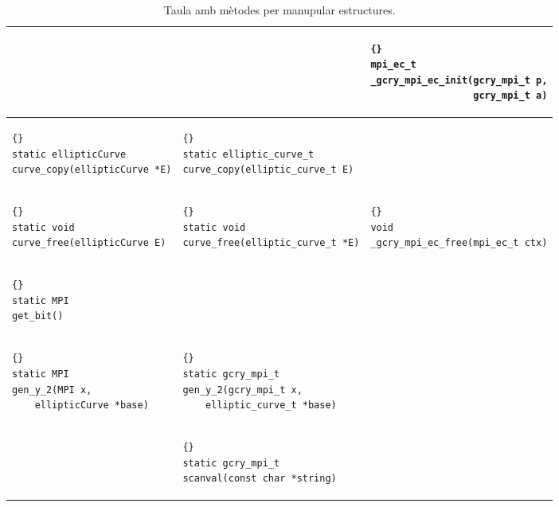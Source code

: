 \documentclass[12pt,twoside,catalan,a4paper]{book}%
\numberwithin{figure}{section}		%
\theoremstyle{definition}   			%
\def\ces{corbes e\lgem{}\'{\i}ptiques}%
\theoremstyle{saltolinea}   			%
\begin{document}
\begin{table}
\begin{center}
\begin{sideways}
\begin{tabular}{|l||l|l|}
\hline
 & &
 {\tt \begin{lstlisting}{}
mpi_ec_t
_gcry_mpi_ec_init(gcry_mpi_t p,
                  gcry_mpi_t a)
      \end{lstlisting} }
 \\
\hline
 {\tt \begin{lstlisting}{}
static ellipticCurve
curve_copy(ellipticCurve *E)
      \end{lstlisting} }
 &
 {\tt \begin{lstlisting}{}
static elliptic_curve_t
curve_copy(elliptic_curve_t E)
      \end{lstlisting} }
 & \\
\hline
 {\tt \begin{lstlisting}{}
static void
curve_free(ellipticCurve E)
      \end{lstlisting} }
 &
 {\tt \begin{lstlisting}{}
static void
curve_free(elliptic_curve_t *E)
      \end{lstlisting} }
 &
 {\tt \begin{lstlisting}{}
void
_gcry_mpi_ec_free(mpi_ec_t ctx)
      \end{lstlisting} }
 \\
\hline
 {\tt \begin{lstlisting}{}
static MPI
get_bit()
      \end{lstlisting} }
 & & \\
\hline
 {\tt \begin{lstlisting}{}
static MPI
gen_y_2(MPI x,
    ellipticCurve *base)
      \end{lstlisting} }
 &
 {\tt \begin{lstlisting}{}
static gcry_mpi_t
gen_y_2(gcry_mpi_t x,
    elliptic_curve_t *base)
      \end{lstlisting} }
 & \\
\hline
 &
 {\tt \begin{lstlisting}{}
static gcry_mpi_t
scanval(const char *string)
      \end{lstlisting} }
 & \\
\hline
\end{tabular}
\end{sideways}
\end{center}
\caption{Taula amb m\`etodes per manupular estructures.\label{tab:useStrucs}}
\end{table}

\end{document}
